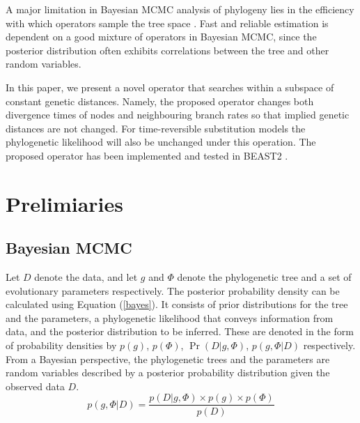 \documentclass{bmcart}
\begin{document}
A major limitation in Bayesian MCMC analysis of phylogeny lies in the efficiency with which operators sample the tree space \cite{lakner2008efficiency,hohna2012guided}. Fast and reliable estimation is dependent on a good mixture of operators in Bayesian MCMC, since the posterior distribution often exhibits correlations between the tree and other random variables. 

In this paper, we present a novel operator that searches within a subspace of constant genetic distances. 
Namely, the proposed operator changes both divergence times of nodes and neighbouring branch rates so that implied genetic distances are not changed. For time-reversible substitution models the phylogenetic likelihood will also be unchanged under this operation. The proposed operator has been implemented and tested in BEAST2 \cite{bouckaert2014beast}. 

\section*{Prelimiaries}
\subsection*{Bayesian MCMC}
Let $D$ denote the data, and let $g$ and $\Phi $ denote the phylogenetic tree and a set of evolutionary parameters respectively. The posterior probability density can be calculated using Equation (\ref{bayes}). It consists of prior distributions for the  tree and the parameters, a phylogenetic likelihood that conveys information from data, and the posterior distribution to be inferred. These are denoted in the form of probability densities by $p(g) $, $p(\Phi )$, $\Pr(D|g,\Phi )$, $p(g,\Phi |D)$ respectively. From a Bayesian perspective, the phylogenetic trees and the parameters are random variables described by a posterior probability distribution given the observed data $D$. 
\begin{equation}\label{bayes}
p(g,\Phi |D) = \frac{{p (D|g,\Phi ) \times p (g) \times p (\Phi )}}{{p (D)}}
\end{equation}
\end{document}
